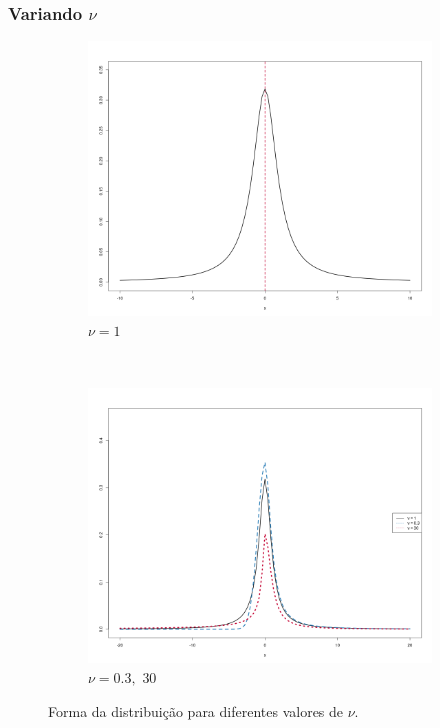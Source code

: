 \documentclass[13pt, aspectratio=169]{beamer}
\begin{document}
\begin{frame}
    \frametitle{Variando $\nu$}
    
    \begin{figure}[!ht]
        \centering
        \begin{subfigure}[t]{0.4\textwidth}
            \centering
            \includegraphics[width=\textwidth]{images/variando_mu_1.png}
            \caption{$\nu = 1$}
        \end{subfigure}%
        ~
        \begin{subfigure}[t]{0.4\textwidth}
            \centering
            \includegraphics[width=\textwidth]{images/variando_nu_2.png}
            \caption{$\nu = 0.3, \,\, 30$}
        \end{subfigure}%
        \caption{Forma da distribuição para diferentes valores de $\nu$.}
    \end{figure} 

\end{frame}
\end{document}
